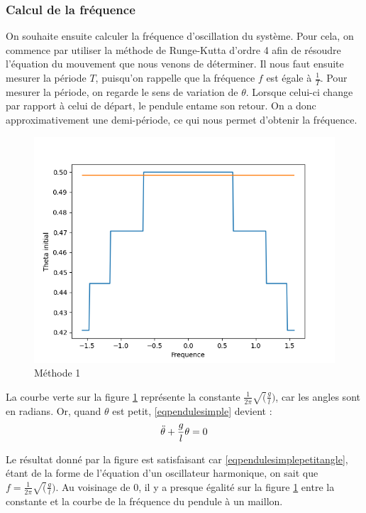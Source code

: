 \documentclass{article}
\begin{document}
\subsubsection{Calcul de la fréquence}

On souhaite ensuite calculer la fréquence d'oscillation du système. Pour cela, on commence par utiliser la méthode de Runge-Kutta d’ordre 4 afin de résoudre l'équation du mouvement que nous venons de déterminer.
Il nous faut ensuite mesurer la période $T$, puisqu'on rappelle que la fréquence $f$ est égale à $\frac{1}{T}$.
Pour mesurer la période, on regarde le sens de variation de $\theta$. Lorsque celui-ci change par rapport à celui de départ, le pendule entame son retour. On a donc approximativement une demi-période, ce qui nous permet d'obtenir la fréquence.  \\

\begin{figure}[H]
\centering
    \includegraphics[scale=0.55]{methode.png}
    \caption{Méthode 1}
    \label{fig:methode1}
\end{figure}     
    

La courbe verte sur la figure \ref{fig:methode1} représente la constante $\frac{1}{2\pi}\sqrt(\frac{g}{l})$, car les angles sont en radians. Or, quand $\theta$ est petit, \eqref{eqpendulesimple} devient :
\begin{equation}
    \Ddot{\theta} + \frac{g}{l}\theta = 0
    \label{eqpendulesimplepetitangle}
\end{equation}

Le résultat donné par la figure  est satisfaisant car \eqref{eqpendulesimplepetitangle}, étant de la forme de l'équation d'un oscillateur harmonique, on sait que $f = \frac{1}{2\pi}\sqrt(\frac{g}{l})$. Au voisinage de $0$, il y a presque égalité sur la figure \ref{fig:methode1} entre la constante et la courbe de la fréquence du pendule à un maillon.
\end{document}
